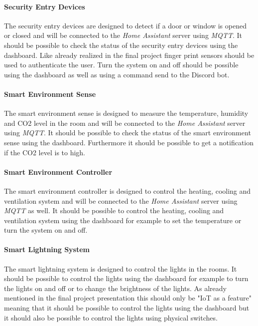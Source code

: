 \paragraph{Security Entry Devices}
The security entry devices are designed to detect if a door or window is opened or closed and will be connected to the 
\textit{Home Assistant} server using \textit{MQTT}. It should be possible to check the status of the security entry 
devices using the dashboard. Like already realized in the final project finger print sensors should be used to 
authenticate the user. Turn the system on and off should be possible using the dashboard as well as using a 
command send to the Discord bot.

\paragraph{Smart Environment Sense}
The smart environment sense is designed to measure the temperature, humidity and CO2 level in the room and will be 
connected to the \textit{Home Assistant} server using \textit{MQTT}. It should be possible to check the status of the 
smart environment sense using the dashboard. Furthermore it should be possible to get a notification if the CO2 level 
is to high.

\paragraph{Smart Environment Controller}
The smart environment controller is designed to control the heating, cooling and ventilation system and will be 
connected to the \textit{Home Assistant} server using \textit{MQTT} as well.
It should be possible to control the heating, cooling and ventilation system using the dashboard for 
example to set the temperature or turn the system on and off.

\paragraph{Smart Lightning System}
The smart lightning system is designed to control the lights in the rooms.
It should be possible to control the lights using the dashboard for example to turn the lights on and off or to change 
the brightness of the lights. As already mentioned in the final project presentation this should only be "IoT as a 
feature" meaning that it should be possible to control the lights using the dashboard but it should also be possible to 
control the lights using physical switches.

